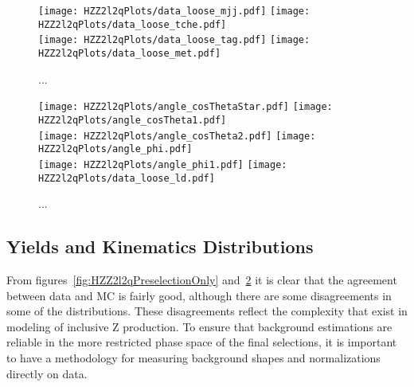 \begin{figure}
\begin{center}
\texttt{[image: HZZ2l2qPlots/data\_loose\_mjj.pdf]}
\texttt{[image: HZZ2l2qPlots/data\_loose\_tche.pdf]}\\
\texttt{[image: HZZ2l2qPlots/data\_loose\_tag.pdf]}
\texttt{[image: HZZ2l2qPlots/data\_loose\_met.pdf]}
\label{fig:HZZ2l2qPreselectiOnly}
\caption{ ... }
\end{center}
\end{figure}

\begin{figure}
\begin{center}
\texttt{[image: HZZ2l2qPlots/angle\_cosThetaStar.pdf]}
\texttt{[image: HZZ2l2qPlots/angle\_cosTheta1.pdf]}\\
\texttt{[image: HZZ2l2qPlots/angle\_cosTheta2.pdf]}
\texttt{[image: HZZ2l2qPlots/angle\_phi.pdf]}\\
\texttt{[image: HZZ2l2qPlots/angle\_phi1.pdf]}
\texttt{[image: HZZ2l2qPlots/data\_loose\_ld.pdf]}
\label{fig:HZZ2l2qAngularLD}
\caption{ ... }
\end{center}
\end{figure}

\subsection{Yields and Kinematics Distributions}
\label{sec:HZZ2l2qyields}

From figures~\ref{fig:HZZ2l2qPreselectionOnly} and~\ref{fig:HZZ2l2qAngularLD}
it is clear that the agreement between data and MC is fairly good,  
although there are some disagreements in some of the distributions.
These disagreements reflect the complexity that exist in modeling of
inclusive Z production.  To ensure that background estimations are
reliable in the more restricted phase space of the final selections,
it is important to have a methodology for measuring background 
shapes and normalizations directly on data.  

